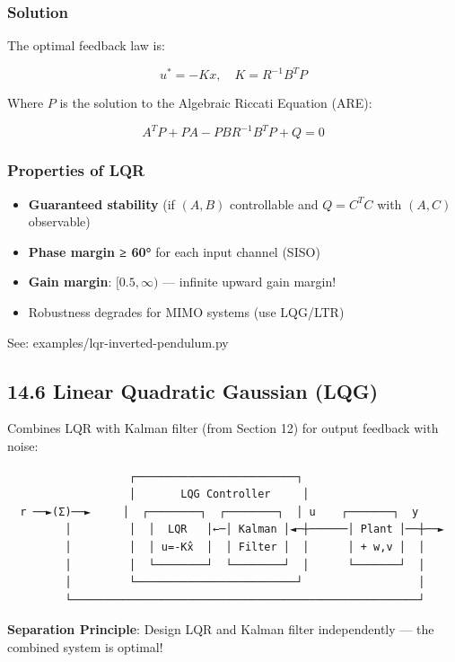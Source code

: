 \documentclass[11pt,a4paper]{book}
\begin{document}
\begin{itemize}
\subsubsection{Solution}

The optimal feedback law is:

\[u^* = -Kx, \quad K = R^{-1}B^T P\]

Where $P$ is the solution to the Algebraic Riccati Equation (ARE):

\[\boxed{A^T P + PA - PBR^{-1}B^T P + Q = 0}\]

\subsubsection{Properties of LQR}

\begin{itemize}
\item \textbf{Guaranteed stability} (if $(A, B)$ controllable and $Q = C^T C$ with $(A, C)$ observable)
\item \textbf{Phase margin ≥ 60°} for each input channel (SISO)
\item \textbf{Gain margin}: $[0.5, \infty)$ — infinite upward gain margin!
\item Robustness degrades for MIMO systems (use LQG/LTR)
\end{itemize}

See: examples/lqr-inverted-pendulum.py

\medskip\noindent\hrulefill\medskip

\subsection{14.6 Linear Quadratic Gaussian (LQG)}

Combines LQR with Kalman filter (from Section 12) for output feedback with noise:

\begin{lstlisting}
                   ┌─────────────────────────┐
                   │       LQG Controller     │
  r ──►(Σ)──►     │  ┌────────┐  ┌────────┐  │ u    ┌───────┐  y
         │         │  │  LQR   │←─│ Kalman │◄─┼──────│ Plant │──┼──►
         │         │  │ u=-Kx̂  │  │ Filter │  │      │ + w,v │  │
         │         │  └────────┘  └────────┘  │      └───────┘  │
         │         └─────────────────────────┘                  │
         └──────────────────────────────────────────────────────┘
\end{lstlisting}

\textbf{Separation Principle}: Design LQR and Kalman filter independently — the combined system is optimal!


\end{itemize}
\end{document}
